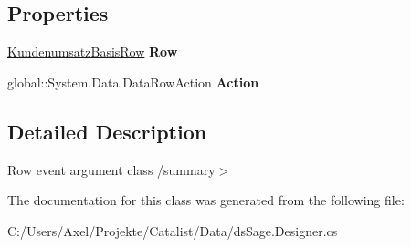 \subsection*{Properties}
\begin{DoxyCompactItemize}
\item 
\hyperlink{class_products_1_1_data_1_1ds_sage_1_1_kundenumsatz_basis_row}{Kundenumsatz\+Basis\+Row} {\bfseries Row}\hypertarget{class_products_1_1_data_1_1ds_sage_1_1_kundenumsatz_basis_row_change_event_aa1d397c73f1353322a43a09c8aed4b3a}{}\label{class_products_1_1_data_1_1ds_sage_1_1_kundenumsatz_basis_row_change_event_aa1d397c73f1353322a43a09c8aed4b3a}

\item 
global\+::\+System.\+Data.\+Data\+Row\+Action {\bfseries Action}\hypertarget{class_products_1_1_data_1_1ds_sage_1_1_kundenumsatz_basis_row_change_event_a9fb0db106061b08a08c6da09993d5363}{}\label{class_products_1_1_data_1_1ds_sage_1_1_kundenumsatz_basis_row_change_event_a9fb0db106061b08a08c6da09993d5363}

\end{DoxyCompactItemize}


\subsection{Detailed Description}
Row event argument class /summary$>$ 

The documentation for this class was generated from the following file\+:\begin{DoxyCompactItemize}
\item 
C\+:/\+Users/\+Axel/\+Projekte/\+Catalist/\+Data/ds\+Sage.\+Designer.\+cs\end{DoxyCompactItemize}
